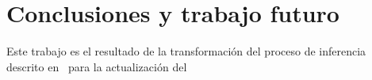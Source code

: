\chapter{Conclusiones y trabajo futuro\label{cap:conclusions}}

Este trabajo es el resultado de la transformación del proceso de
inferencia descrito en~\cite{sevilla2015} para la actualización del

